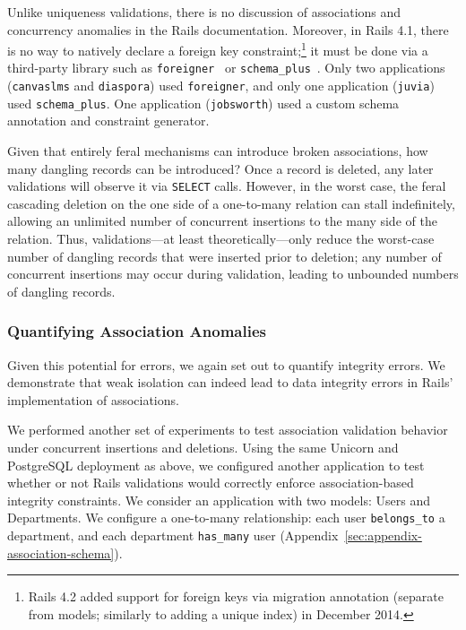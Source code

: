 Unlike uniqueness validations, there is no discussion of associations
and concurrency anomalies in the Rails documentation. Moreover, in
Rails 4.1, there is no way to natively declare a foreign key
constraint;\footnote{Rails 4.2 added support for foreign keys via
  migration annotation (separate from models; similarly to adding a
  unique index) in December 2014.} it must be done via a third-party
library such as \texttt{foreigner}~\cite{foreigner} or
\texttt{schema\_plus}~\cite{schemaplus}. Only two applications
(\texttt{canvaslms} and \texttt{diaspora}) used \texttt{foreigner},
and only one application (\texttt{juvia}) used
\texttt{schema\_plus}. One application (\texttt{jobsworth}) used a
custom schema annotation and constraint generator.

 Given that entirely
feral mechanisms can introduce broken associations, how many dangling
records can be introduced? Once a record is deleted, any later
validations will observe it via \texttt{SELECT} calls. However, in the
worst case, the feral cascading deletion on the one side of a
one-to-many relation can stall indefinitely, allowing an unlimited
number of concurrent insertions to the many side of the
relation. Thus, validations---at least theoretically---only reduce the
worst-case number of dangling records that were inserted prior to
deletion; any number of concurrent insertions may occur during
validation, leading to unbounded numbers of dangling records.

\subsubsection{Quantifying Association Anomalies}

Given this potential for errors, we again set out to quantify
integrity errors. We demonstrate that weak isolation can indeed lead
to data integrity errors in Rails' implementation of associations.

We performed another set of experiments to test association validation
behavior under concurrent insertions and deletions. Using the same
Unicorn and PostgreSQL deployment as above, we configured another
application to test whether or not Rails validations would correctly
enforce association-based integrity constraints. We consider an
application with two models: Users and Departments. We configure a
one-to-many relationship: each user \texttt{belongs\_to} a department,
and each department \texttt{has\_many} user
(Appendix~\ref{sec:appendix-association-schema}).

